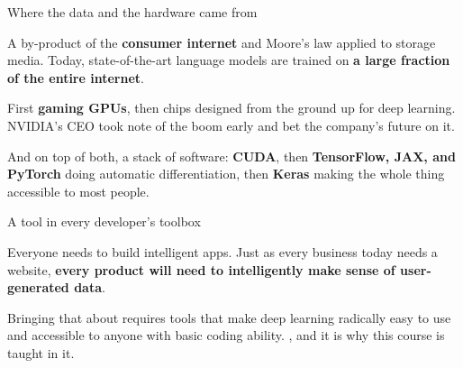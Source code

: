 \documentclass[aspectratio=169,11pt,t]{beamer}
\begin{document}
\begin{frame}[shrink=25]{Where the data and the hardware came from}
\begin{minipage}[t]{0.494\textwidth}
\begin{icardaccent}
A by-product of the \textbf{consumer internet} and Moore's law applied to storage media. Today, state-of-the-art language models are trained on \textbf{a large fraction of the entire internet}.
\end{icardaccent}
\end{minipage}%
\hfill
\begin{minipage}[t]{0.494\textwidth}
\begin{icardaccent}
First \textbf{gaming GPUs}, then chips designed from the ground up for deep learning. NVIDIA's CEO took note of the boom early and bet the company's future on it.
\end{icardaccent}
\end{minipage}%
{\fontsize{9.4}{12.6}\selectfont\color{fg2}And on top of both, a stack of software: \textbf{CUDA}, then \textbf{TensorFlow, JAX, and PyTorch} doing automatic differentiation, then \textbf{Keras} making the whole thing accessible to most people.\par}\vskip 4pt
\end{frame}

\begin{frame}[shrink=25]{A tool in every developer's toolbox}
{\fontsize{9.4}{12.6}\selectfont\color{fg2}Everyone needs to build intelligent apps. Just as every business today needs a website, \textbf{every product will need to intelligently make sense of user-generated data}.\par}\vskip 4pt
{\fontsize{9.4}{12.6}\selectfont\color{fg2}Bringing that about requires tools that make deep learning radically easy to use and accessible to anyone with basic coding ability. , and it is why this course is taught in it.\par}\vskip 4pt
\end{frame}

\end{document}
